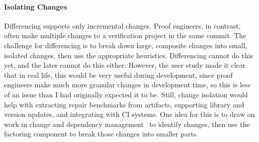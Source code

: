 \paragraph{Isolating Changes} Differencing supports only incremental changes.
Proof engineers, in contrast, often make multiple changes to a verification project in the same commit. %
The challenge for differencing is to break down large, composite changes into small, isolated changes,
then use the appropriate heuristics.
Differencing cannot do this yet, and the later \toolnamec cannot do this either.
However, the user study made it clear that in real life, this would be very useful during development,
since proof engineers make much more granular changes in development time, %
so this is less of an issue than I had originally expected it to be.
Still, change isolation would help with extracting repair benchmarks from artifacts, supporting library and version updates, and integrating with CI systems.
One idea for this is to draw on work in change and dependency management~\cite{873647, Autexier:2010:CMH:1986659.1986663, Celik:2017:IRP:3155562.3155588} to identify changes,
then use the factoring component to break those changes into smaller parts.


